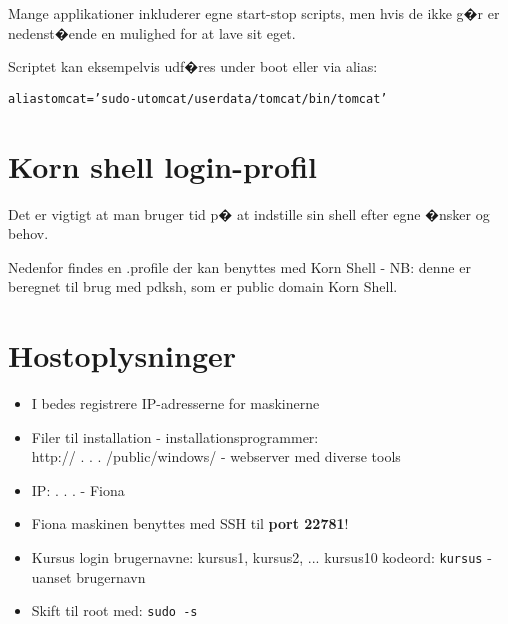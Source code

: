 \documentclass[a4paper,11pt,notitlepage]{oevelser}
\begin{document}
Mange applikationer inkluderer egne start-stop scripts, men hvis de
ikke g�r er nedenst�ende en mulighed for at lave sit eget.

Scriptet kan eksempelvis udf�res under boot eller via alias:
\begin{alltt}
\small
alias tomcat=' sudo -u tomcat /userdata/tomcat/bin/tomcat'
\end{alltt}


\chapter{Korn shell login-profil }

Det er vigtigt at man bruger tid p� at indstille sin shell efter egne
�nsker og behov.

Nedenfor findes en .profile der kan benyttes med Korn Shell - NB:
denne er beregnet til brug med pdksh, som er public domain Korn Shell.

{}



\chapter{Hostoplysninger}

\begin{itemize}
\item I bedes registrere IP-adresserne for maskinerne
\item Filer til installation - installationsprogrammer:\\
http:// \hskip 15mm .\hskip 15mm .\hskip 15mm .\hskip 15mm
/public/windows/ - webserver med diverse tools
\item IP: \hskip 15mm .\hskip 15mm .\hskip 15mm .\hskip 15mm - Fiona
\item Fiona maskinen benyttes med SSH til {\bf port 22781}!
\item Kursus login brugernavne: kursus1, kursus2, ... kursus10
kodeord: \verb+kursus+ - uanset brugernavn
\item Skift til root med: \verb+sudo -s+
\end{itemize}
\end{document}
